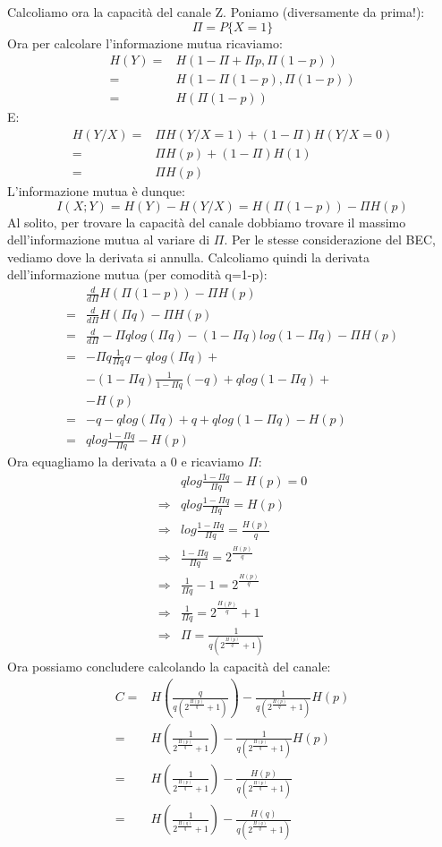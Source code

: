 \noindent
Calcoliamo ora la capacità del canale Z.
Poniamo (diversamente da prima!):
\[
 \Pi=P\{X=1\}
\]
Ora per calcolare l'informazione mutua ricaviamo:
\[\begin{split}
 H(Y)=&H(1-\Pi+\Pi p,\Pi (1-p)) \\
     =&H(1-\Pi(1-p),\Pi(1-p)) \\
     =&H(\Pi(1-p))
  \end{split}
\]
E:
\[\begin{split}
 H(Y/X)=&\Pi H(Y/X=1)+(1-\Pi)H(Y/X=0) \\
     =&\Pi H(p) + (1-\Pi)H(1) \\
     =&\Pi H(p) 
  \end{split}
\]
L'informazione mutua è dunque:
\[
 I(X;Y)=H(Y)-H(Y/X)=H(\Pi(1-p))-\Pi H(p)
\]
Al solito, per trovare la capacità del canale dobbiamo trovare il massimo 
dell'informazione mutua al variare di $\Pi$.
Per le stesse considerazione del BEC, vediamo dove la derivata si annulla.
Calcoliamo quindi la derivata dell'informazione mutua (per comodità q=1-p):
\[\begin{split}
 &\frac{d}{d \Pi}  H(\Pi(1-p))-\Pi H(p) \\
 =&\frac{d}{d \Pi}  H(\Pi q)-\Pi H(p) \\
 =&\frac{d}{d \Pi} -\Pi q log(\Pi q) - (1-\Pi q) log(1-\Pi q) -\Pi H(p) \\
 =& -\Pi q \frac{1}{\Pi q} q - qlog(\Pi q)  + \\
  &  -(1-\Pi q) \frac{1}{1-\Pi q} (-q) + q log(1- \Pi q)   +  \\
  &  -H(p) \\
 =& -q -qlog(\Pi q)+ q + qlog(1-\Pi q) -H(p) \\
 =& qlog \frac{1-\Pi q}{\Pi q} -H(p)
 \end{split}
\]
Ora equagliamo la derivata a 0 e ricaviamo $\Pi$:
\[\begin{split}
 & qlog \frac{1-\Pi q}{\Pi q} - H(p)=0 \\
 \Rightarrow & qlog \frac{1-\Pi q}{\Pi q}=H(p) \\
 \Rightarrow & log \frac{1-\Pi q}{\Pi q}=\frac{H(p)}{q} \\
 \Rightarrow & \frac{1-\Pi q}{\Pi q}=2^{\frac{H(p)}{q}} \\
 \Rightarrow & \frac{1}{\Pi q}-1=2^{\frac{H(p)}{q}} \\
 \Rightarrow & \frac{1}{\Pi q}=2^{\frac{H(p)}{q}}+1 \\
 \Rightarrow & \Pi=\frac{1}{q(2^{\frac{H(p)}{q}}+1)}
\end{split}
\]
Ora possiamo concludere calcolando la capacità del canale:
\[\begin{split}
 C=& H \left ( \frac{q}{q(2^{\frac{H(p)}{q}}+1)} \right)-\frac{1}{q(2^{\frac{H(p)}{q}}+1)} H(p) \\
  =& H \left (\frac{1}{2^{\frac{H(p)}{q}}+1} \right)-\frac{1}{q(2^{\frac{H(p)}{q}}+1)} H(p) \\
  =& H \left (\frac{1}{2^{\frac{H(p)}{q}}+1} \right)-\frac{H(p)}{q(2^{\frac{H(p)}{q}}+1)} \\
  =& H \left (\frac{1}{2^{\frac{H(q)}{q}}+1} \right)-\frac{H(q)}{q(2^{\frac{H(q)}{q}}+1)} \\
 \end{split}
\]


